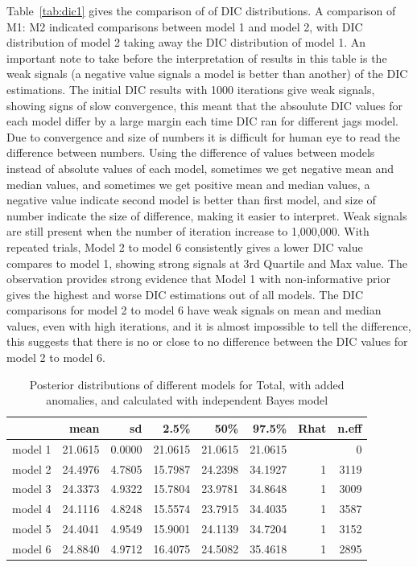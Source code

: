 Table~\ref{tab:dic1} gives the comparison of of DIC distributions. A comparison of M1: M2 indicated comparisons between model 1 and model 2, with DIC distribution of model 2 taking away the DIC distribution of model 1. An important note to take before the interpretation of results in this table is the weak signals (a negative value signals a model is better than another) of the DIC estimations. The initial DIC results with 1000 iterations give weak signals, showing signs of slow convergence, this meant that the absoulute DIC values for each model differ by a large margin each time DIC ran for different jags model. Due to convergence and size of numbers it is difficult for human eye to read the difference between numbers. Using the difference of values between models instead of absolute values of each model, sometimes we get negative mean and median values, and sometimes we get positive mean and median values, a negative value indicate second model is better than first model, and size of number indicate the size of difference, making it easier to interpret. Weak signals are still present when the number of iteration increase to 1,000,000. With repeated trials, Model 2 to model 6 consistently gives a lower DIC value compares to model 1, showing strong signals at 3rd Quartile and Max value. The observation provides strong evidence that Model 1 with non-informative prior gives the highest and worse DIC estimations out of all models. The DIC comparisons for model 2 to model 6 have weak signals on mean and median values, even with high iterations, and it is almost impossible to tell the difference, this suggests that there is no or close to no difference between the DIC values for model 2 to model 6. 

\newpage %

\begin{table}[!ht]
	\centering
	\begin{tabular}{rrrrrrrr}
		\hline
		& mean & sd & 2.5\% & 50\% & 97.5\% & Rhat & n.eff \\ 
		\hline
		model 1 & 21.0615 & 0.0000 & 21.0615 & 21.0615 & 21.0615 &  & 0 \\ 
		model 2 & 24.4976 & 4.7805 & 15.7987 & 24.2398 & 34.1927 & 1 & 3119 \\ 
		model 3 & 24.3373 & 4.9322 & 15.7804 & 23.9781 & 34.8648 & 1 & 3009\\ 
		model 4 & 24.1116 & 4.8248 & 15.5574 & 23.7915 & 34.4035 & 1 & 3587 \\ 
		model 5 & 24.4041 & 4.9549 & 15.9001 & 24.1139 & 34.7204 & 1 & 3152 \\ 
		model 6 & 24.8840 & 4.9712 & 16.4075 & 24.5082 & 35.4618 & 1& 2895 \\ 
		\hline
	\end{tabular}
	\caption{Posterior distributions of different models for Total, with added anomalies, and calculated with independent Bayes model} 
	\label{tab:modelpost1}
\end{table}

